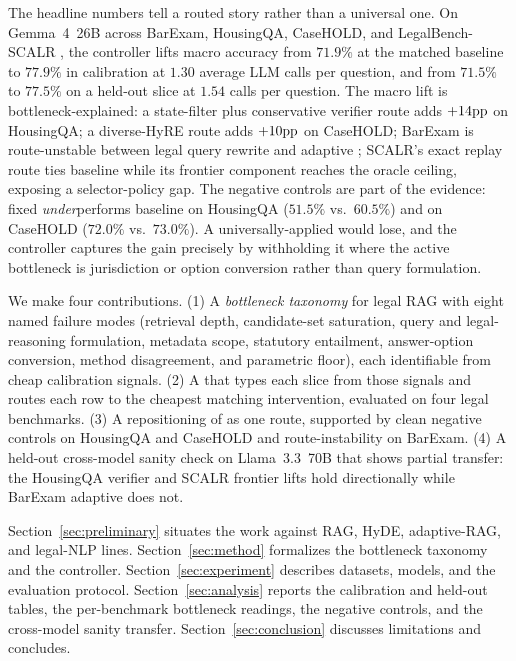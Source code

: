 The headline numbers tell a routed story rather than a universal one. On
Gemma~4~26B across BarExam, HousingQA, CaseHOLD, and LegalBench-SCALR
\citep{zheng2025legalretrieval,guha2023legalbench}, the controller lifts
macro accuracy from $71.9\%$ at the matched baseline to $77.9\%$ in
calibration at $1.30$ average LLM calls per question, and from $71.5\%$ to
$77.5\%$ on a held-out slice at $1.54$ calls per question. The macro lift is
bottleneck-explained: a state-filter plus conservative verifier route adds
$+14\mathrm{pp}$ on HousingQA; a diverse-HyRE route adds $+10\mathrm{pp}$ on CaseHOLD;
BarExam is route-unstable between legal query rewrite and adaptive \hyre{};
SCALR's exact replay route ties baseline while its frontier component
reaches the oracle ceiling, exposing a selector-policy gap. The negative
controls are part of the evidence: fixed \hyre{} \emph{under}performs
baseline on HousingQA ($51.5\%$ vs.\ $60.5\%$) and on CaseHOLD ($72.0\%$
vs.\ $73.0\%$). A universally-applied \hyre{} would lose, and the controller
captures the gain precisely by withholding it where the active bottleneck is
jurisdiction or option conversion rather than query formulation.

We make four contributions. (1) A \emph{bottleneck taxonomy} for legal RAG
with eight named failure modes (retrieval depth, candidate-set saturation,
query and legal-reasoning formulation, metadata scope, statutory entailment,
answer-option conversion, method disagreement, and parametric floor), each
identifiable from cheap calibration signals. (2) A \framework{} that types
each slice from those signals and routes each row to the cheapest matching
intervention, evaluated on four legal benchmarks. (3) A repositioning of
\hyre{} as one route, supported by clean negative controls on HousingQA and
CaseHOLD and route-instability on BarExam. (4) A held-out cross-model sanity
check on Llama~3.3~70B that shows partial transfer: the HousingQA verifier
and SCALR frontier lifts hold directionally while BarExam adaptive \hyre{}
does not.

Section~\ref{sec:preliminary} situates the work against RAG, HyDE,
adaptive-RAG, and legal-NLP lines. Section~\ref{sec:method} formalizes the
bottleneck taxonomy and the controller. Section~\ref{sec:experiment}
describes datasets, models, and the evaluation protocol.
Section~\ref{sec:analysis} reports the calibration and held-out tables, the
per-benchmark bottleneck readings, the negative controls, and the
cross-model sanity transfer. Section~\ref{sec:conclusion} discusses
limitations and concludes.
